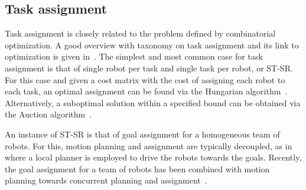 
\subsection{Task assignment}
Task assignment is closely related to the problem defined by combinatorial optimization.
A good overview with taxonomy on task assignment and its link to optimization is given in~\cite{Gerkey:2004il}. The simplest and most common case for task assignment is that of single robot per task and single task per robot, or ST-SR. For this case and given a cost matrix with the cost of assigning each robot to each task, an optimal assignment can be found via the Hungarian algorithm~\cite{kuhn55}. Alternatively, a suboptimal solution within a specified bound can be obtained via the Auction algorithm~\cite{Bertsekas:1992wx}.

An instance of ST-SR is that of goal assignment for a homogeneous team of robots. For this, motion planning and assignment are typically decoupled, as in~\cite{alonsomora12ijrr} where a local planner is employed to drive the robots towards the goals.
Recently, the goal assignment for a team of robots has been combined with motion planning towards concurrent planning and assignment~\cite{Turpin:2014bu}.

